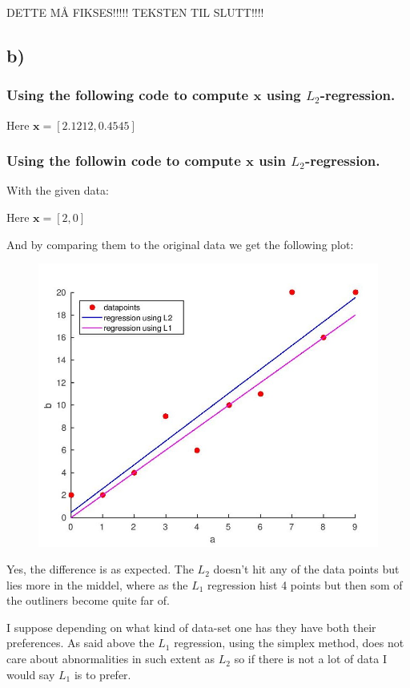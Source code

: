 \documentclass{article}
\renewcommand{\vec}[1]{\mathbf{#1}}
\begin{document}
DETTE MÅ FIKSES!!!!!  TEKSTEN TIL SLUTT!!!!
\subsection*{b)}
\subsubsection*{Using the following code to compute $\vec{x}$ using $L_2$-regression.}

Here $\vec{x} = [2.1212, 0.4545]$

\newpage
\subsubsection*{Using the followin code to compute $\vec{x}$ usin $L_2$-regression.}

With the given data:


Here $\vec{x}= [2, 0]$

And by comparing them to the original data we get the following plot:
\begin{figure}[H]
  \centering
  \includegraphics[scale = 0.3]{plot.jpg}
\end{figure}

Yes, the difference is as expected. The $L_2$ doesn't hit any of the data points but lies more in the middel, where as the $L_1$ regression hist 4 points but then som of the outliners become quite far of.

I suppose depending on what kind of data-set one has they have both their preferences. As said above the $L_1$ regression, using the simplex method, does not care about abnormalities in such extent as $L_2$ so if there is not a lot of data I would say $L_1$ is to prefer.
\end{document}
